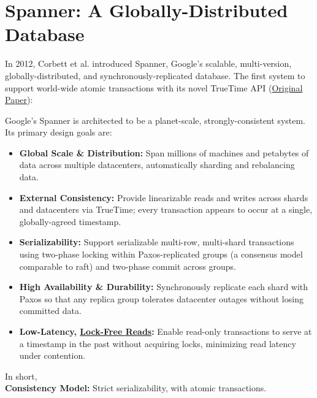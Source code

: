 \newpage
\section{Spanner: A Globally-Distributed Database}
\label{sec:spanner}

\noindent
In 2012, Corbett et al. introduced Spanner, Google's scalable, multi-version, globally-distributed, and synchronously-replicated database.
The first system to support world-wide atomic transactions with its novel TrueTime API (\href{https://static.googleusercontent.com/media/research.google.com/en//archive/spanner-osdi2012.pdf}{Original Paper}):

\vspace{2em}
\begin{Def}

    Google's Spanner is architected to be a planet-scale, strongly-consistent system.  Its primary design goals are:
    
    \begin{itemize}
      \item \textbf{Global Scale \& Distribution:} Span millions of machines and petabytes of data across multiple datacenters, automatically sharding and rebalancing data.
      \item \textbf{External Consistency:} Provide linearizable reads and writes across shards and datacenters via TrueTime; every transaction appears to occur at a single, globally-agreed timestamp.
      \item \textbf{Serializability:} Support serializable multi-row, multi-shard transactions using two-phase locking within Paxos-replicated groups (a consensus model comparable to raft) and two-phase commit across groups.
      \item \textbf{High Availability \& Durability:} Synchronously replicate each shard with Paxos so that any replica group tolerates datacenter outages without losing committed data.
      \item \textbf{Low-Latency, \underline{Lock-Free Reads}:} Enable read-only transactions to serve at a timestamp in the past without acquiring locks, minimizing read latency under contention.
    \end{itemize}

    \noindent
    In short,\\
    \textbf{Consistency Model:} Strict serializability, with atomic transactions.
    \end{Def}
    
